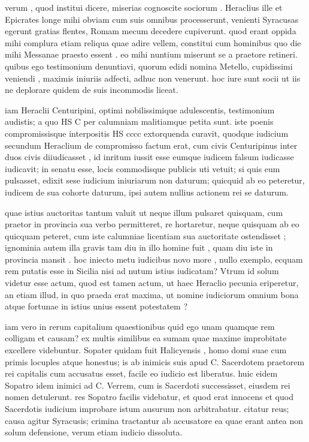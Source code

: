  verum , quod institui dicere, miserias cognoscite sociorum . Heraclius ille et Epicrates longe mihi obviam cum suis omnibus processerunt, venienti Syracusas egerunt gratias flentes, Romam mecum decedere cupiverunt. quod erant oppida mihi complura etiam reliqua quae adire vellem, constitui cum hominibus quo die mihi Messanae praesto essent . eo mihi nuntium miserunt se a praetore retineri. quibus ego testimonium denuntiavi, quorum edidi nomina Metello, cupidissimi veniendi , maximis iniuriis adfecti, adhuc non venerunt. hoc iure sunt socii ut iis ne deplorare quidem de suis incommodis liceat.

 iam Heraclii Centuripini, optimi nobilissimique adulescentis, testimonium audistis; a quo HS C per calumniam malitiamque petita sunt. iste poenis compromissisque interpositis HS cccc extorquenda curavit, quodque iudicium secundum Heraclium de compromisso factum erat, cum civis Centuripinus inter duos civis diiudicasset , id inritum iussit esse eumque iudicem falsum iudicasse iudicavit; in senatu esse, locis commodisque publicis uti vetuit; si quis eum pulsasset, edixit sese iudicium iniuriarum non daturum; quicquid ab eo peteretur, iudicem de sua cohorte daturum, ipsi autem nullius actionem rei se daturum.

 quae istius auctoritas tantum valuit ut neque illum pulsaret quisquam, cum praetor in provincia sua verbo permitteret, re hortaretur, neque quisquam ab eo quicquam peteret, cum iste calumniae licentiam sua auctoritate ostendisset ; ignominia autem illa gravis tam diu in illo homine fuit , quam diu iste in provincia mansit . hoc iniecto metu iudicibus novo more , nullo exemplo, ecquam rem putatis esse in Sicilia nisi ad nutum istius iudicatam? Vtrum id solum videtur esse actum, quod est tamen actum, ut haec Heraclio pecunia eriperetur, an etiam illud, in quo praeda erat maxima, ut nomine iudiciorum omnium bona atque fortunae in istius unius essent potestatem ?

 iam vero in rerum capitalium quaestionibus quid ego unam quamque rem colligam et causam? ex multis similibus ea sumam quae maxime improbitate excellere videbuntur. Sopater quidam fuit Halicyensis , homo domi suae cum primis locuples atque honestus; is ab inimicis suis apud C. Sacerdotem praetorem rei capitalis cum accusatus esset, facile eo iudicio est liberatus. huic eidem Sopatro idem inimici ad C. Verrem, cum is Sacerdoti successisset, eiusdem rei nomen detulerunt. res Sopatro facilis videbatur, et quod erat innocens et quod Sacerdotis iudicium improbare istum ausurum non arbitrabatur. citatur reus; causa agitur Syracusis; crimina tractantur ab accusatore ea quae erant antea non solum defensione, verum etiam iudicio dissoluta.

